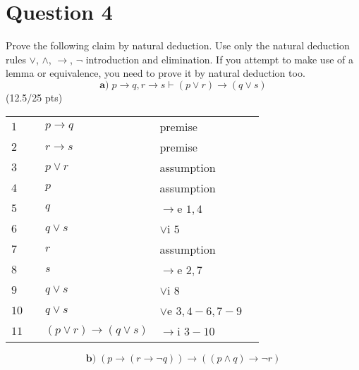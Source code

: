 \documentclass[a4paper,12pt]{article}
\newcommand\tab[1][1cm]{\hspace*{#1}}
\begin{document}
\section*{Question 4 \hfill {}}
\tab Prove the following claim by natural deduction. Use only the natural deduction rules $\vee$, $\wedge$, $\rightarrow$, $\neg$ introduction and elimination. If you attempt to make use of a lemma or equivalence, you need to prove it by natural deduction too.
\begin{equation*}
    \textbf{a)} \; p \rightarrow q, r \rightarrow s \vdash (p \vee r) \rightarrow (q \vee s)
\end{equation*}
\hfill \small{(12.5/25 pts)}\\
\begin{tcolorbox}
\centering
\begin{tabular}{l l l l l}
    $1$  & & $p \rightarrow q$ & premise & \\
    
    $2$  & & $r \rightarrow s$ & premise & \\ \cline{2-5}
    
    $3$  & \multicolumn{1}{|l}{} & $p \vee r$ & assumption & \multicolumn{1}{l|}{} \\ \cline{3-4}
    
    $4$  & \multicolumn{1}{|l}{} & \multicolumn{1}{|l}{$p$} & \multicolumn{1}{l|}{assumption} & \multicolumn{1}{l|}{} \\
    
    $5$  & \multicolumn{1}{|l}{} & \multicolumn{1}{|l}{$q$} & \multicolumn{1}{l|}{$\rightarrow$e $1,4$} & \multicolumn{1}{l|}{} \\
    
    $6$  & \multicolumn{1}{|l}{} & \multicolumn{1}{|l}{$q \vee s$} & \multicolumn{1}{l|}{$\vee$i $5$} & \multicolumn{1}{l|}{} \\ \cline{3-4} \cline{3-4}
    
    $7$  & \multicolumn{1}{|l}{} & \multicolumn{1}{|l}{$r$} & \multicolumn{1}{l|}{assumption} & \multicolumn{1}{l|}{} \\
    
    $8$  & \multicolumn{1}{|l}{} & \multicolumn{1}{|l}{$s$} & \multicolumn{1}{l|}{$\rightarrow$e $2,7$} & \multicolumn{1}{l|}{} \\
    
    $9$  & \multicolumn{1}{|l}{} & \multicolumn{1}{|l}{$q \vee s$} & \multicolumn{1}{l|}{$\vee$i $8$} & \multicolumn{1}{l|}{} \\ \cline{3-4}
    
    $10$ & \multicolumn{1}{|l}{} & $q \vee s$ & $\vee$e $3,4-6,7-9$ & \multicolumn{1}{l|}{} \\ \cline{2-5}
    
    $11$ & & $(p \vee r) \rightarrow (q \vee s)$ & $\rightarrow$i $3-10$ &
\end{tabular}
\end{tcolorbox}
\begin{equation*}
     \textbf{b)} \;  (p \rightarrow (r \rightarrow \neg q)) \rightarrow ((p \wedge q) \rightarrow \neg r)
\end{equation*}
\end{document}
